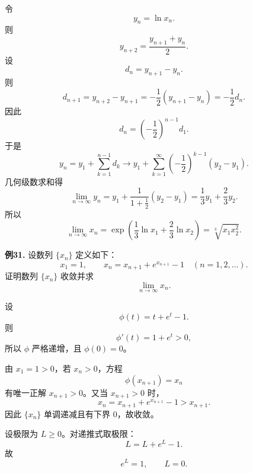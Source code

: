 \begin{solutionblock}

令
\[
y_n=\ln x_n.
\]
则
\[
y_{n+2}=\frac{y_{n+1}+y_n}{2}.
\]
设
\[
d_n=y_{n+1}-y_n.
\]
则
\[
d_{n+1}=y_{n+2}-y_{n+1}
=-\frac12(y_{n+1}-y_n)
=-\frac12d_n.
\]
因此
\[
d_n=\left(-\frac12\right)^{n-1}d_1.
\]
于是
\[
y_n=y_1+\sum_{k=1}^{n-1}d_k
\to y_1+\sum_{k=1}^{\infty}\left(-\frac12\right)^{k-1}(y_2-y_1).
\]
几何级数求和得
\[
\lim_{n\to\infty}y_n
=y_1+\frac{1}{1+\frac12}(y_2-y_1)
=\frac13y_1+\frac23y_2.
\]
所以
\[
\lim_{n\to\infty}x_n
=\exp\left(\frac13\ln x_1+\frac23\ln x_2\right)
=\sqrt[3]{x_1x_2^2}.
\]

\end{solutionblock}

\begin{problemblock}
\textbf{例31.} 设数列 \(\{x_n\}\) 定义如下：
\[
x_1=1,\qquad x_n=x_{n+1}+e^{x_{n+1}}-1\quad(n=1,2,\dots).
\]
证明数列 \(\{x_n\}\) 收敛并求
\[
\lim_{n\to\infty}x_n.
\]
\end{problemblock}

\begin{solutionblock}

设
\[
\phi(t)=t+e^t-1.
\]
则
\[
\phi'(t)=1+e^t>0,
\]
所以 \(\phi\) 严格递增，且 \(\phi(0)=0\)。

由 \(x_1=1>0\)，若 \(x_n>0\)，方程
\[
\phi(x_{n+1})=x_n
\]
有唯一正解 \(x_{n+1}>0\)。又当 \(x_{n+1}>0\) 时，
\[
x_n=x_{n+1}+e^{x_{n+1}}-1>x_{n+1}.
\]
因此 \(\{x_n\}\) 单调递减且有下界 0，故收敛。

设极限为 \(L\ge0\)。对递推式取极限：
\[
L=L+e^L-1.
\]
故
\[
e^L=1,\qquad L=0.
\]

\end{solutionblock}
